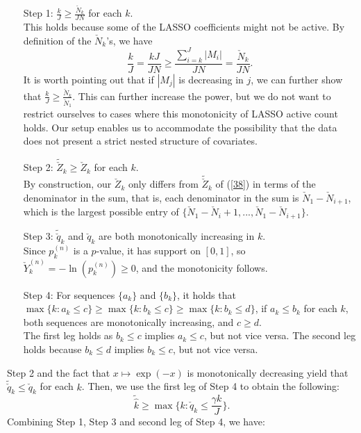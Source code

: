\documentclass[11pt]{article}
\newcommand{\NL}{\\[.4cm]}
\begin{document}
	\begin{enumerate}
		\item [Step 1:] $\frac{ k}{J}\geq\frac{\check{N}_k}{JN}$ for each $k$.\NL
		This holds because some of the LASSO coefficients might not be active. By definition of the $\check{N}_k$'s, we have
		\begin{equation}
			\frac{k}{J}=\frac{kJ}{JN}\geq\frac{\sum_{i=k}^J|M_i|}{JN}=\frac{\check{N}_k}{JN} .
		\end{equation}
		It is worth pointing out that if $|M_j|$ is decreasing in $j$, we can further show that $\frac{k}{J}\geq \frac{\check{N}_k}{\check{N}_1} $. This can further increase the power, but we do not want to restrict ourselves to cases where this monotonicity of LASSO active count holds. Our setup enables us to accommodate the possibility that the data does not present a strict nested structure of covariates.%
		\item [Step 2:] $\tilde{\check{Z}}_k\geq {\check{Z}}_k$ for each $k$.\NL
		By construction, our ${\check{Z}}_k$ only differs from $\tilde{\check{Z}}_k$ of (\ref{38}) in terms of the denominator in the sum, that is, each denominator in the sum is $\check{N}_1-\check{N}_{i+1}$, which is the largest possible entry of $\{\check{N}_1-\check{N}_i+1,...,\check{N}_1-\check{N}_{i+1}\}$.
		\item[Step 3:] $\tilde{\check{q}}_k$ and ${\check{q}}_k$ are both monotonically increasing in $k$.\NL
		Since $p^{(n)}_k$ is a $p$-value, it has support on $[0,1]$, so $\check{Y}^{(n)}_k=-\ln (p^{(n)}_k)\geq0$, and the monotonicity follows. 
		\item[Step 4:] For sequences $\{a_k\}$ and $\{b_k\}$, it holds that $\max\{k: a_k\leq c\}\geq \max\{k: b_k\leq c\}\geq\max\{k: b_k\leq d\} $, if $a_k\leq b_k$  for each $k$, both sequences are monotonically increasing, and $c\geq d$.\NL
		The first leg holds as $b_k\leq c$ implies $a_k\leq c$, but not vice versa. The second leg holds because $b_k\leq d$ implies $b_k\leq c$, but not vice versa.
	\end{enumerate}
	Step 2 and the fact that $x\mapsto \exp(-x)$ is monotonically decreasing yield that $\tilde{\check{q}}_k\leq {\check{q}}_k$ for each $k$. Then, we use the first leg of Step 4 to obtain the following:
	\begin{equation}\label{40}
		\tilde{\hat{k}}\geq\max\{k:    {\check{q}}_k\leq\frac{\gamma k}{J}\}.
	\end{equation}
	Combining Step 1, Step 3 and second leg of Step 4, we have:
\end{document}

